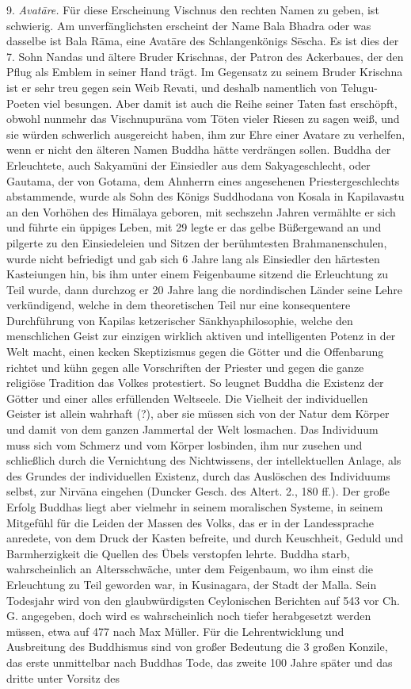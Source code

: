 \documentclass{article}
\begin{document}
9. \emph{Avat\={a}re.} Für diese Erscheinung Vischnus den rechten Namen zu geben, ist schwierig. Am unverfänglichsten erscheint der Name Bala Bhadra oder was dasselbe ist Bala R\={a}ma, eine Avat\={a}re des Schlangenkönigs S\={e}scha. Es ist dies der 7. Sohn Nandas und ältere Bruder Krischnas, der Patron des Ackerbaues, der den Pflug als Emblem in seiner Hand trägt. Im Gegensatz zu seinem Bruder Krischna ist er sehr treu gegen sein Weib Revati, und deshalb namentlich von Telugu-Poeten viel besungen. Aber damit ist auch die Reihe seiner Taten fast erschöpft, obwohl nunmehr das Vischnupur\={a}na vom Töten vieler Riesen zu sagen weiß, und sie würden schwerlich ausgereicht haben, ihm zur Ehre einer Avatare zu verhelfen, wenn er nicht den älteren Namen Buddha hätte verdrängen sollen. Buddha der Erleuchtete, auch Sakyam\={u}ni der Einsiedler aus dem Sakyageschlecht, oder Gautama, der von Gotama, dem Ahnherrn eines angesehenen Priestergeschlechts abstammende, wurde als Sohn des Königs Suddhodana von Kosala in Kapilavastu an den Vorhöhen des Him\={a}laya geboren, mit sechszehn Jahren vermählte er sich und führte ein üppiges Leben, mit 29 legte er das gelbe Büßergewand an und pilgerte zu den Einsiedeleien und Sitzen der berühmtesten Brahmanenschulen, wurde nicht befriedigt und gab sich 6 Jahre lang als Einsiedler den härtesten Kasteiungen hin, bis ihm unter einem Feigenbaume sitzend die Erleuchtung zu Teil wurde, dann durchzog er 20 Jahre lang die nordindischen Länder seine Lehre verkündigend, welche in dem theoretischen Teil nur eine konsequentere Durchführung von Kapilas ketzerischer S\={a}nkhyaphilosophie, welche den menschlichen Geist zur einzigen wirklich aktiven und intelligenten Potenz in der Welt macht, einen kecken Skeptizismus gegen die Götter und die Offenbarung richtet und kühn gegen alle Vorschriften der Priester und gegen die ganze religiöse Tradition das Volkes protestiert. So leugnet Buddha die Existenz der Götter und einer alles erfüllenden Weltseele. Die Vielheit der individuellen Geister ist allein wahrhaft (?), aber sie müssen sich von der Natur dem Körper und damit von dem ganzen Jammertal der Welt losmachen. Das Individuum muss sich vom Schmerz und vom Körper losbinden, ihm nur zusehen und schließlich durch die Vernichtung des Nichtwissens, der intellektuellen Anlage, als des Grundes der individuellen Existenz, durch das Auslöschen des Individuums selbst, zur Nirv\={a}na eingehen (Duncker Gesch. des Altert. 2., 180 ff.). Der große Erfolg Buddhas liegt aber vielmehr in seinem moralischen Systeme, in seinem Mitgefühl für die Leiden der Massen des Volks, das er in der Landessprache anredete, von dem Druck der Kasten befreite, und durch Keuschheit, Geduld und Barmherzigkeit die Quellen des Übels verstopfen lehrte. Buddha starb, wahrscheinlich an Altersschwäche, unter dem Feigenbaum, wo ihm einst die Erleuchtung zu Teil geworden war, in Kusinagara, der Stadt der Malla. Sein Todesjahr wird von den glaubwürdigsten Ceylonischen Berichten auf 543 vor Ch. G. angegeben, doch wird es wahrscheinlich noch tiefer herabgesetzt werden müssen, etwa auf 477 nach Max Müller. Für die Lehrentwicklung und Ausbreitung des Buddhismus sind von großer Bedeutung die 3 großen Konzile, das erste unmittelbar nach Buddhas Tode, das zweite 100 Jahre später und das dritte unter Vorsitz des 
\end{document}

